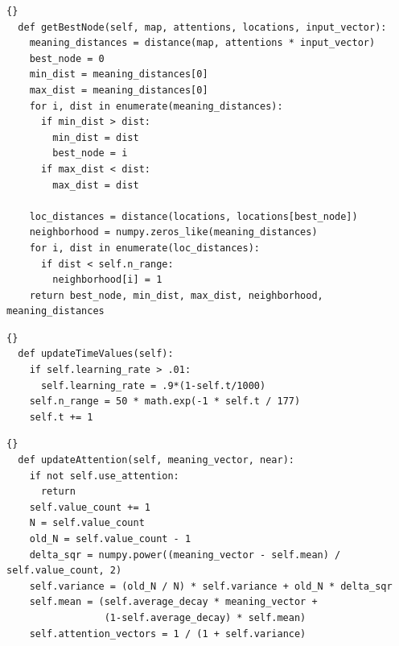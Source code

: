 \documentclass[a4paper,11pt]{article}
\begin{document}
\begin{center}
\begin{table}
\begin{lstlisting}[frame=tb, label=cd:getBestNode, caption=Source code for retrieving the best node
and it's neighborhood from a single map]{}
  def getBestNode(self, map, attentions, locations, input_vector):
    meaning_distances = distance(map, attentions * input_vector)
    best_node = 0
    min_dist = meaning_distances[0]
    max_dist = meaning_distances[0]
    for i, dist in enumerate(meaning_distances):
      if min_dist > dist:
        min_dist = dist
        best_node = i
      if max_dist < dist:
        max_dist = dist 
    
    loc_distances = distance(locations, locations[best_node])
    neighborhood = numpy.zeros_like(meaning_distances)
    for i, dist in enumerate(loc_distances):
      if dist < self.n_range:
        neighborhood[i] = 1
    return best_node, min_dist, max_dist, neighborhood, meaning_distances
\end{lstlisting}
\end{table}
\end{center}

\begin{center}
\begin{table}
\begin{lstlisting}[frame=tb, label=cd:updateTimeValues, caption=Source code for updating the learning rate
and neighborhood radius]{}
  def updateTimeValues(self):
    if self.learning_rate > .01:
      self.learning_rate = .9*(1-self.t/1000)
    self.n_range = 50 * math.exp(-1 * self.t / 177)
    self.t += 1
\end{lstlisting}
\end{table}
\end{center}

\begin{center}
\begin{table}
\begin{lstlisting}[frame=tb, label=cd:updateAttention, caption=Source code for updating attentional
weights]{} 
  def updateAttention(self, meaning_vector, near):
    if not self.use_attention:
      return
    self.value_count += 1
    N = self.value_count
    old_N = self.value_count - 1
    delta_sqr = numpy.power((meaning_vector - self.mean) / self.value_count, 2)
    self.variance = (old_N / N) * self.variance + old_N * delta_sqr
    self.mean = (self.average_decay * meaning_vector +
                 (1-self.average_decay) * self.mean)
    self.attention_vectors = 1 / (1 + self.variance)
\end{lstlisting}
\end{table}
\end{center}
\end{document}
